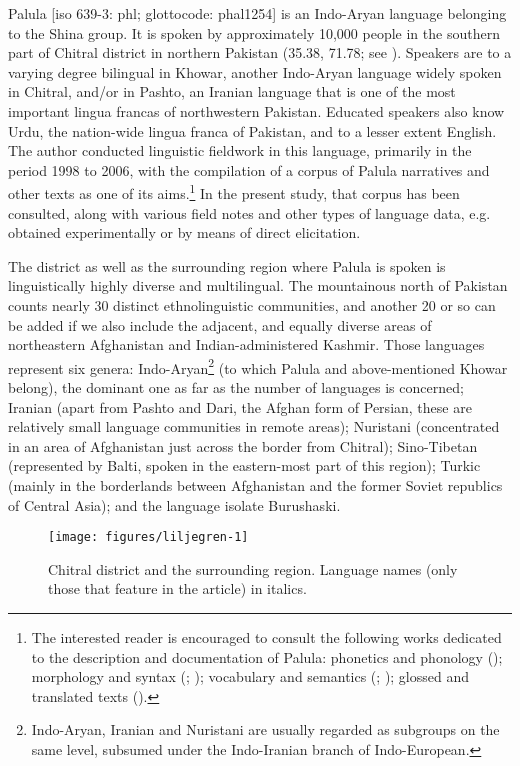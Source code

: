 \documentclass[output=paper]{langsci/langscibook}
\begin{document}
Palula [iso 639-3: phl; glottocode: phal1254] is an Indo-Aryan language belonging to the Shina group. It is spoken by approximately 10,000 people in the southern part of Chitral district in northern Pakistan (35.38, 71.78; see ). Speakers are to a varying degree bilingual in Khowar, another Indo-Aryan language widely spoken in Chitral, and/or in Pashto, an Iranian language that is one of the most important lingua francas of northwestern Pakistan. Educated speakers also know Urdu, the nation-wide lingua franca of Pakistan, and to a lesser extent English. The author conducted linguistic fieldwork in this language, primarily in the period 1998 to 2006, with the compilation of a corpus of Palula narratives and other texts as one of its aims.\footnote{The interested reader is encouraged to consult the following works dedicated to the description and documentation of Palula: phonetics and phonology (\citealt{LiljegrenHaider2009}); morphology and syntax (\citealt{Liljegren2010}; \citeyear{Liljegren2016}); vocabulary and semantics (\citealt{LiljegrenHaider2011}; \citeyear{LiljegrenHaider2015a}); glossed and translated texts (\citealt{LiljegrenHaider2015b}).}
In the present study, that corpus has been consulted, along with various field notes and other types of language data, e.g. obtained experimentally or by means of direct elicitation. 

The district as well as the surrounding region where Palula is spoken is linguistically highly diverse and multilingual. The mountainous north of Pakistan counts nearly 30 distinct ethnolinguistic communities, and another 20 or so can be added if we also include the adjacent, and equally diverse areas of northeastern Afghanistan and Indian-administered Kashmir. Those languages represent six genera: Indo-Aryan\footnote{Indo-Aryan, Iranian and Nuristani are usually regarded as subgroups on the same level, subsumed under the Indo-Iranian branch of Indo-European.} (to which Palula and above-mentioned Khowar belong), the dominant one as far as the number of languages is concerned; Iranian (apart from Pashto and Dari, the Afghan form of Persian, these are relatively small language communities in remote areas); Nuristani (concentrated in an area of Afghanistan just across the border from Chitral); Sino-Tibetan (represented by Balti, spoken in the eastern-most part of this region); Turkic (mainly in the borderlands between Afghanistan and the former Soviet republics of Central Asia); and the language isolate Burushaski.

\begin{figure}
\centering
  \texttt{[image: figures/liljegren-1]}
  \caption{Chitral district and the surrounding region. Language names (only those that feature in the article) in italics.}
  \label{fig:hl1}
\end{figure}
\end{document}
